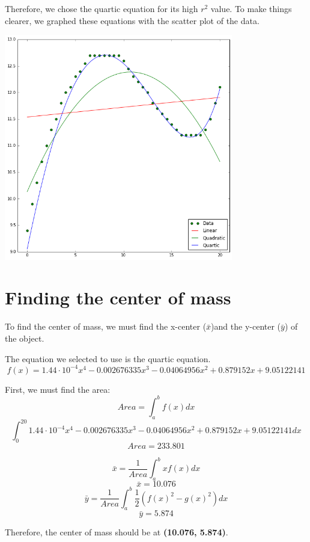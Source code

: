 \documentclass{article}
\begin{document}
    Therefore, we chose the quartic equation for its high $r^2$ value.
    To make things clearer, we graphed these equations with the scatter plot of the data.
    \begin{center}
    \includegraphics[width=10cm]{download}
    \end{center}
\section{Finding the center of mass}
    To find the center of mass, we must find the x-center ($\bar{x}$)and the y-center ($\bar{y}$) of the object.
    
    The equation we selected to use is the quartic equation. 
    $$ f(x) = 1.44\cdot10^{-4}x^4 - 0.002676335x^3 - 0.04064956x^2 + 0.879152x + 9.05122141$$
    
    First, we must find the area:
    $$Area = \int_{a}^{b} f(x) dx $$
    $$\int_{0}^{20} 1.44\cdot10^{-4}x^4 - 0.002676335x^3 - 0.04064956x^2 + 0.879152x + 9.05122141  dx $$
    $$Area = 233.801$$
    
    $$\bar{x} = \frac{1}{Area} \int_{a}^{b} xf(x) dx$$
    $$\bar{x} = 10.076 $$
    $$\bar{y} = \frac{1}{Area} \int_{a}^{b} \frac{1}{2} (f(x)^2 - g(x)^2) dx$$
    $$\bar{y} = 5.874 $$
    
    Therefore, the center of mass should be at \textbf{(10.076, 5.874)}.
    
    
\pagebreak    
\end{document}
